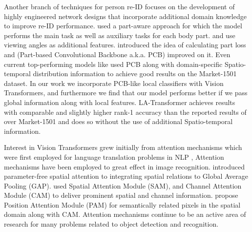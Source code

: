 \documentclass{article}
\begin{document}
Another branch of techniques for person re-ID focuses on the development of highly engineered network designs that incorporate additional domain knowledge to improve re-ID performance.  \citet{PartAware} used a part-aware approach for which the model performs the main task as well as auxiliary tasks for each body part. \citet{ViewpointVehicleReID} and \citet{Viewpoint} use viewing angles as additional features. \citet{PartLoss}  introduced the idea of calculating part loss and \citet{PCB} (Part-based Convolutional Backbone a.k.a. PCB) improved on it. Even current top-performing models like \citet{STReid} used PCB along with domain-specific Spatio-temporal distribution information to achieve good results on the Market-1501 dataset. In our work we incorporate PCB-like local classifiers with Vision Transformers, and furthermore we find that our model performs better if we pass global information along with local features.  LA-Transformer achieves results with comparable and slightly higher rank-1 accuracy than the reported results of \citet{STReid} over Market-1501 and does so without the use of additional Spatio-temporal information.

Interest in Vision Transformers grew initially from attention mechanisms which were first employed for language translation problems in NLP \citep{firstAttention}, Attention mechanisms have been employed to great effect in image recognition. \citet{spatialattention} introduced parameter-free spatial attention to integrating spatial relations to Global Average Pooling (GAP). \citet{SAM_CAM} used Spatial Attention Module (SAM), and Channel Attention Module (CAM) to deliver prominent spatial and channel information. \citet{abdnet} propose Position Attention Module (PAM) for semantically related pixels in the spatial domain along with CAM.  Attention mechanisms continue to be an active area of research for many problems related to object detection and recognition.
\end{document}
